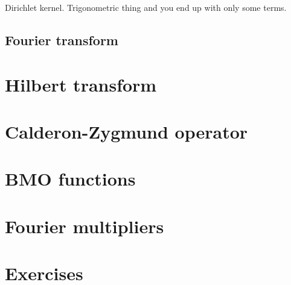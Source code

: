 \documentclass[palatino]{epflnotes}
\begin{document}
Dirichlet kernel. Trigonometric thing and you end up with only some terms.


\section{Fourier transform}

\chapter{Hilbert transform}

\chapter{Calderon-Zygmund operator}

\chapter{BMO functions}

\chapter{Fourier multipliers}

\appendix

\chapter{Exercises}

\backmatter

\nocite{muscalu2013classical}


\printindex
\end{document}
